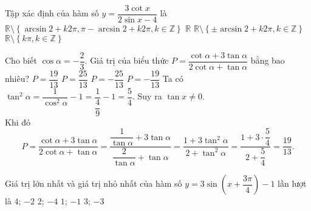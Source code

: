 \begin{ex}%
Tập xác định của hàm số $y=\dfrac{3\cot x}{2\sin x-4}$ là
\choice
{$\mathbb{R} \setminus \left\{ \arcsin 2+k2\pi,\pi -\arcsin 2+k2\pi,k \in \mathbb{Z} \right\}$}
{$\mathbb{R}$}
{$\mathbb{R} \setminus \left\{ \pm \arcsin 2+k2\pi,k \in \mathbb{Z} \right\}$}
{\True $\mathbb{R} \setminus \left\{ k\pi,k \in \mathbb{Z} \right\}$}
\end{ex}

\begin{ex}%
Cho biết $\cos \alpha=-\dfrac{2}{3}$. Giá trị của biểu thức $P=\dfrac{\cot \alpha+3\tan \alpha}{2\cot \alpha+\tan \alpha}$ bằng bao nhiêu?
\choice
{\True $P=\dfrac{19}{13}$}
{$P=\dfrac{25}{13}$}
{$P=-\dfrac{25}{13}$}
{$P=-\dfrac{19}{13}$}
\loigiai
{
Ta có $\tan^2 \alpha = \dfrac{1}{\cos^2\alpha}-1 = \dfrac{1}{\dfrac{4}{9}}-1 = \dfrac{5}{4}$. Suy ra $\tan x\neq 0$.\\
Khi đó
\[P=\dfrac{\cot \alpha+3\tan \alpha}{2\cot \alpha+\tan \alpha} = \dfrac{\dfrac{1}{\tan\alpha} + 3\tan\alpha}{\dfrac{2}{\tan\alpha} + \tan\alpha} = \dfrac{1+3\tan^2 \alpha}{2+\tan^2 \alpha} = \dfrac{1+3\cdot \dfrac{5}{4}}{2+\dfrac{5}{4}} = \dfrac{19}{13}.\]
}
\end{ex}

\begin{ex}%
Giá trị lớn nhất và giá trị nhỏ nhất của hàm số $y=3 \sin \left(x+\dfrac{3 \pi}{4}\right)-1$ lần lượt là
\choice
{$4$; $-2$}
{\True $2$; $-4$}
{$1$; $-1$}
{$3$; $-3$}
\end{ex}

